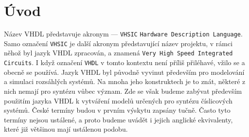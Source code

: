 {  \section{Úvod}
    Název VHDL představuje akronym — \texttt{VHSIC} \texttt{Hardware Des\-cription Language}. Samo 
    označení \texttt{VHSIC} je další akronym představující název projektu, v rámci něhož byl jazyk 
    VHDL zpracován, a znamená \texttt{Very High Speed Integrated Circuits}. I když označení 
    \texttt{VHDL} v tomto kontextu není příliš přiléhavé, vžilo se a obecně se používá. Jazyk VHDL 
    byl původně vyvinut především pro modelování a simulaci rozsáhlých systémů. Na mnoha jeho 
    konstruktech je to znát, některé z nich nemají pro syntézu vůbec význam. Zde se však budeme 
    zabývat především použitím jazyka VHDL k vytváření modelů určených pro syntézu číslicových 
    systémů. České termíny budou v prvním výskytu zapsány tučně. Často tyto termíny nejsou 
    ustálené, a proto budeme uvádět i jejich anglické ekvivalenty, které již většinou mají 
    ustálenou podobu.

}
